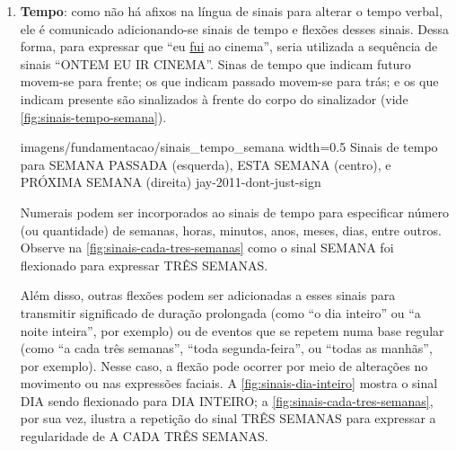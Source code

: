 \begin{enumerate}
        {imagens/fundamentacao/verbos_simples} %
        {width=0.5\linewidth} %
        {Verbos simples DIRIGIR, COMER, e PARECER} %
        {pereira-2011-conhecimento-alem-sinais} %

        {imagens/fundamentacao/verbos_direcionais} %
        {width=0.5\linewidth} %
        {Verbos direcionais PERGUNTAR e RESPONDER} %
        {pereira-2011-conhecimento-alem-sinais} %

        {imagens/fundamentacao/verbos_espaciais} %
        {width=0.5\linewidth} %
        {Verbos espaciais IR, CHEGAR, e POR} %
        {pereira-2011-conhecimento-alem-sinais} %

    \item \textbf{Tempo}: como não há afixos na língua de sinais para alterar o tempo verbal, ele é comunicado adicionando-se sinais de tempo e flexões desses sinais. Dessa forma, para expressar que ``eu \underline{fui} ao cinema'', seria utilizada a sequência de sinais ``ONTEM EU IR CINEMA''.    
    Sinas de tempo que indicam futuro movem-se para frente; os que indicam passado movem-se para trás; e os que indicam presente são sinalizados à frente do corpo do sinalizador (vide \autoref{fig:sinais-tempo-semana}).
    
        {imagens/fundamentacao/sinais_tempo_semana} %
        {width=0.5\linewidth} %
        {Sinais de tempo para SEMANA PASSADA (esquerda), ESTA SEMANA (centro), e PRÓXIMA SEMANA (direita)} %
        {jay-2011-dont-just-sign} %

    Numerais podem ser incorporados ao sinais de tempo para especificar número (ou quantidade) de semanas, horas, minutos, anos, meses, dias, entre outros. Observe na \autoref{fig:sinais-cada-tres-semanas} como o sinal SEMANA foi flexionado para expressar TRÊS SEMANAS.

    Além disso, outras flexões podem ser adicionadas a esses sinais para transmitir significado de duração prolongada (como ``o dia inteiro'' ou ``a noite inteira'', por exemplo) ou de eventos que se repetem numa base regular (como ``a cada três semanas'', ``toda segunda-feira'', ou ``todas as manhãs'', por exemplo). Nesse caso, a flexão pode ocorrer por meio de alterações no movimento ou nas expressões faciais. A \autoref{fig:sinais-dia-inteiro} mostra o sinal DIA sendo flexionado para DIA INTEIRO; a \autoref{fig:sinais-cada-tres-semanas}, por sua vez, ilustra a repetição do sinal TRÊS SEMANAS para expressar a regularidade de A CADA TRÊS SEMANAS.
    

\end{enumerate}
